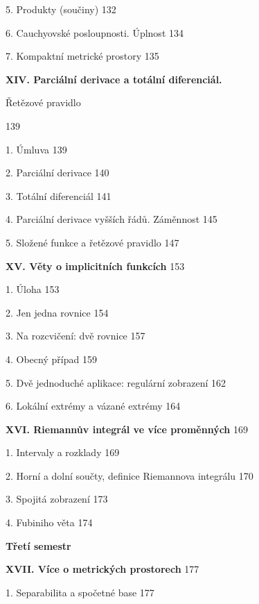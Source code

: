 \documentclass[12pt]{article}
\begin{document}
 \hskip5mm 5.  Produkty (součiny) \hskip10mm 132
 
 \hskip5mm 6. Cauchyovské posloupnosti. Úplnost\hskip10mm 134
 
 \hskip5mm 7.  Kompaktní metrické prostory \hskip10mm 135
 
 \bigskip
 
 {\bf XIV. Parciální derivace a totální diferenciál.
  
\hskip12mm Řetězové pravidlo} \hskip10mm 139
 
 \hskip5mm 1. Úmluva \hskip10mm 139
 
 \hskip5mm 2.  Parciální derivace \hskip10mm 140
 
 \hskip5mm 3. Totální diferenciál \hskip10mm 141
 
 \hskip5mm 4.  Parciální derivace vyšších řádů. Záměnnost \hskip10mm 145
 
 \hskip5mm 5.  Složené funkce a řetězové pravidlo \hskip10mm 147
 
 \bigskip
 
 {\bf XV. Věty o implicitních funkcích} \hskip10mm 153
 
 \hskip5mm 1.  Úloha \hskip10mm 153
 
 \hskip5mm 2. Jen jedna rovnice \hskip10mm 154
 
 \hskip5mm 3. Na rozcvičení: dvě rovnice \hskip10mm 157
 
 \hskip5mm 4.  Obecný případ \hskip10mm 159
 
 \hskip5mm 5.  Dvě jednoduché aplikace: regulární zobrazení \hskip10mm 162
 
 \hskip5mm 6.  Lokální extrémy a vázané extrémy\hskip10mm 164
 
 \bigskip
 
 {\bf XVI.  Riemannův integrál ve více proměnných} \hskip10mm 169
 
 \hskip5mm 1. Intervaly a rozklady \hskip10mm 169
 
 \hskip5mm 2. Horní a dolní součty, definice Riemannova integrálu
\hskip10mm 170
 
 \hskip5mm 3.  Spojitá zobrazení \hskip10mm 173
 
 \hskip5mm 4. Fubiniho věta \hskip10mm 174
 
 \vskip15mm
 
 \hskip20mm{\bf\large Třetí semestr}
 
 \vskip10mm
 
 
 {\bf XVII. Více o metrických prostorech} \hskip10mm 177
 
 \hskip5mm 1. Separabilita a spočetné base \hskip10mm 177
 
\end{document}
